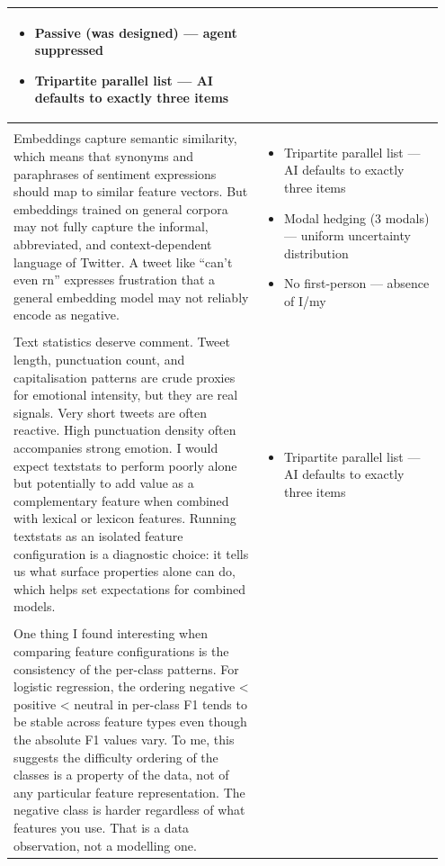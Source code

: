 \documentclass[11pt]{article}
\begin{document}
\begin{longtable}{|p{0.55\linewidth}|p{0.40\linewidth}|}
\begin{itemize}[leftmargin=1em,itemsep=1pt,topsep=1pt,parsep=0pt]
  \item Passive (was designed) --- agent suppressed
  \item Tripartite parallel list --- AI defaults to exactly three items
\end{itemize} \\[2pt]
\hline
\rule[-3.5cm]{0pt}{3.5cm} & \\
\hline
Embeddings capture semantic similarity, which means that synonyms and paraphrases of sentiment expressions should map to similar feature vectors. But embeddings trained on general corpora may not fully capture the informal, abbreviated, and context-dependent language of Twitter. A tweet like ``can't even rn'' expresses frustration that a general embedding model may not reliably encode as negative. & \begin{itemize}[leftmargin=1em,itemsep=1pt,topsep=1pt,parsep=0pt]
  \item Tripartite parallel list --- AI defaults to exactly three items
  \item Modal hedging (3 modals) --- uniform uncertainty distribution
  \item No first-person --- absence of I/my
\end{itemize} \\[2pt]
\hline
\rule[-3.5cm]{0pt}{3.5cm} & \\
\hline
Text statistics deserve comment. Tweet length, punctuation count, and capitalisation patterns are crude proxies for emotional intensity, but they are real signals. Very short tweets are often reactive. High punctuation density often accompanies strong emotion. I would expect textstats to perform poorly alone but potentially to add value as a complementary feature when combined with lexical or lexicon features. Running textstats as an isolated feature configuration is a diagnostic choice: it tells us what surface properties alone can do, which helps set expectations for combined models. & \begin{itemize}[leftmargin=1em,itemsep=1pt,topsep=1pt,parsep=0pt]
  \item Tripartite parallel list --- AI defaults to exactly three items
\end{itemize} \\[2pt]
\hline
\rule[-3.5cm]{0pt}{3.5cm} & \\
\hline
One thing I found interesting when comparing feature configurations is the consistency of the per-class patterns. For logistic regression, the ordering negative < positive < neutral in per-class F1 tends to be stable across feature types even though the absolute F1 values vary. To me, this suggests the difficulty ordering of the classes is a property of the data, not of any particular feature representation. The negative class is harder regardless of what features you use. That is a data observation, not a modelling one. &  \\[2pt]

\end{longtable}
\end{document}
